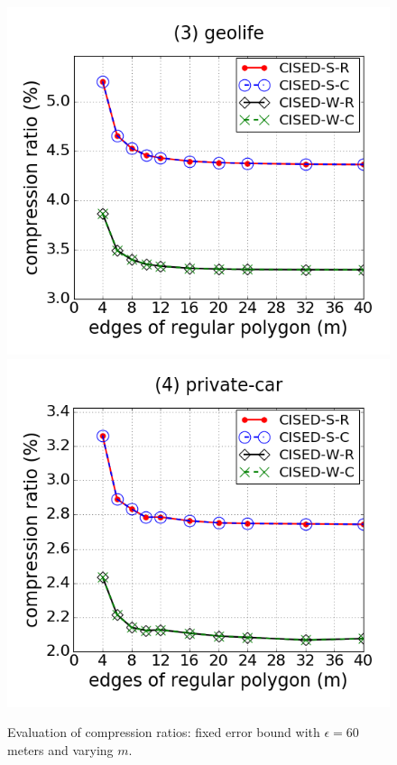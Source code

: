 \begin{figure}[tb!]
\includegraphics[scale = 0.250]{figures/Exp-M-e-60-CR-geolife.png}
\includegraphics[scale = 0.250]{figures/Exp-M-e-60-CR-private.png}
\vspace{-2ex}
\caption{\small Evaluation of compression ratios: fixed error bound with $\epsilon=60$ meters and varying $m$.}
\label{fig:m-cr-e60}
\vspace{-2ex}
\end{figure}


